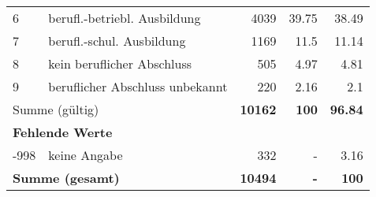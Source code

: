 \begin{longtable}{lXrrr}
     6 &
     \multicolumn{1}{X}{ berufl.-betriebl. Ausbildung   } &


       \num{4039} &
       \num[round-mode=places,round-precision=2]{39,75} &
         \num[round-mode=places,round-precision=2]{38,49} \\

     7 &
     \multicolumn{1}{X}{ berufl.-schul. Ausbildung   } &


       \num{1169} &
       \num[round-mode=places,round-precision=2]{11,5} &
         \num[round-mode=places,round-precision=2]{11,14} \\

     8 &
     \multicolumn{1}{X}{ kein beruflicher Abschluss   } &


       \num{505} &
       \num[round-mode=places,round-precision=2]{4,97} &
         \num[round-mode=places,round-precision=2]{4,81} \\

     9 &
     \multicolumn{1}{X}{ beruflicher Abschluss unbekannt   } &


       \num{220} &
       \num[round-mode=places,round-precision=2]{2,16} &
         \num[round-mode=places,round-precision=2]{2,1} \\
     \midrule
     \multicolumn{2}{l}{Summe (gültig)} &
       \textbf{\num{10162}} &
     \textbf{100} &
       \textbf{\num[round-mode=places,round-precision=2]{96,84}} \\
     \multicolumn{5}{l}{\textbf{Fehlende Werte}}\\
       -998 &
       keine Angabe &
         \num{332} &
        - &
         \num[round-mode=places,round-precision=2]{3,16} \\
     \midrule
     \multicolumn{2}{l}{\textbf{Summe (gesamt)}} &
          \textbf{\num{10494}} &
        \textbf{-} &
        \textbf{100} \\
     \bottomrule
     \end{longtable}
     
